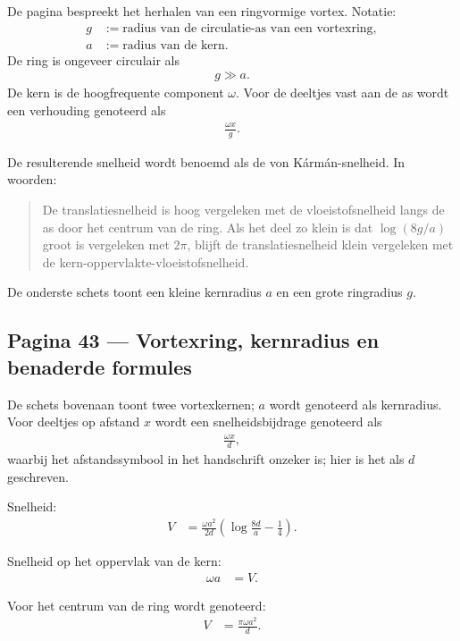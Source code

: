 \documentclass[11pt]{article}
\newcommand{\onzeker}[1]{\textcolor{red!70!black}{#1}}
\begin{document}
De pagina bespreekt het herhalen van een ringvormige vortex. Notatie:
\begin{align*}
g &:= \text{radius van de circulatie-as van een vortexring},\\
a &:= \text{radius van de kern}.
\end{align*}
De ring is ongeveer circulair als
\begin{align*}
g\gg a.
\end{align*}
De kern is de hoogfrequente component $\omega$. Voor de deeltjes vast aan de as wordt een verhouding genoteerd als
\begin{align*}
\frac{\omega x}{g}.
\end{align*}

De resulterende snelheid wordt benoemd als de von Kármán-snelheid. In woorden:
\begin{quote}
De translatiesnelheid is hoog vergeleken met de vloeistofsnelheid langs de as door het centrum van de ring. Als het deel zo klein is dat $\log(8g/a)$ groot is vergeleken met $2\pi$, blijft de translatiesnelheid klein vergeleken met de kern-oppervlakte-vloeistofsnelheid.
\end{quote}

De onderste schets toont een kleine kernradius $a$ en een grote ringradius $g$.

\subsection*{Pagina 43 --- Vortexring, kernradius en benaderde formules}

De schets bovenaan toont twee vortexkernen; $a$ wordt genoteerd als kernradius. Voor deeltjes op afstand $x$ wordt een snelheidsbijdrage genoteerd als
\begin{align*}
\frac{\omega x}{d},
\end{align*}
waarbij het afstandssymbool in het handschrift \onzeker{onzeker} is; hier is het als $d$ geschreven.

Snelheid:
\begin{align*}
V
  &=
  \frac{\omega a^2}{2d}
  \left(
     \log\frac{8d}{a}
     -\frac{1}{4}
  \right).
\end{align*}

Snelheid op het oppervlak van de kern:
\begin{align*}
\omega a
  &= V.
\end{align*}

Voor het centrum van de ring wordt genoteerd:
\begin{align*}
V
  &=
  \frac{\pi\omega a^2}{d}.
\end{align*}
\end{document}

